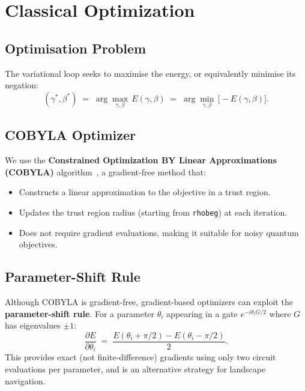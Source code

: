 \documentclass[11pt,a4paper]{article}
\begin{document}
\section{Classical Optimization}\label{sec:optimization}

\subsection{Optimisation Problem}

The variational loop seeks to maximise the energy, or equivalently minimise its
negation:
\begin{equation}\label{eq:opt}
  (\gamma^*,\beta^*) \;=\; \arg\max_{\gamma,\beta}\, E(\gamma,\beta)
  \;=\; \arg\min_{\gamma,\beta}\, \bigl[-E(\gamma,\beta)\bigr].
\end{equation}

\subsection{COBYLA Optimizer}

We use the \textbf{Constrained Optimization BY Linear Approximations (COBYLA)}
algorithm~\cite{powell1994}, a gradient-free method that:
\begin{itemize}
  \item Constructs a linear approximation to the objective in a trust region.
  \item Updates the trust region radius (starting from \texttt{rhobeg}) at each
        iteration.
  \item Does not require gradient evaluations, making it suitable for noisy
        quantum objectives.
\end{itemize}

\subsection{Parameter-Shift Rule}

Although COBYLA is gradient-free, gradient-based optimizers can exploit the
\textbf{parameter-shift rule}.  For a parameter $\theta_i$ appearing in a gate
$e^{-i\theta_i G/2}$ where $G$ has eigenvalues $\pm 1$:
\begin{equation}\label{eq:param-shift}
  \frac{\partial E}{\partial \theta_i}
  \;=\; \frac{E(\theta_i + \pi/2) - E(\theta_i - \pi/2)}{2}.
\end{equation}
This provides exact (not finite-difference) gradients using only two circuit
evaluations per parameter, and is an alternative strategy for landscape
navigation.
\end{document}
